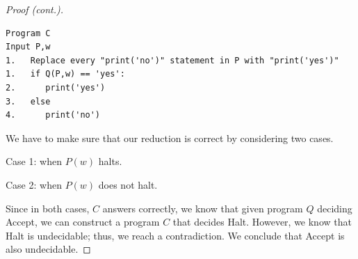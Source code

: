 \begin{frame}[fragile=true]
  \begin{proof}[Proof (cont.)]
    {\footnotesize
\begin{verbatim}
Program C       
Input P,w       
1.   Replace every "print('no')" statement in P with "print('yes')"
1.   if Q(P,w) == 'yes':
2.      print('yes')
3.   else
4.      print('no')
\end{verbatim}
    }   
    {\small
      We have to make sure that our reduction is correct by considering
      two cases.
      
      Case 1: when $P(w)$ halts. \pause

      Case 2: when $P(w)$ does not halt. \pause

      Since in both cases, $C$ answers correctly, we know that given
      program $Q$ deciding {\sc Accept}, we can construct a program
      $C$ that decides {\sc Halt}.  However, we know that {\sc Halt}
      is undecidable; thus, we reach a contradiction.  We conclude
      that {\sc Accept} is also undecidable.  }
  \end{proof}
\end{frame}




